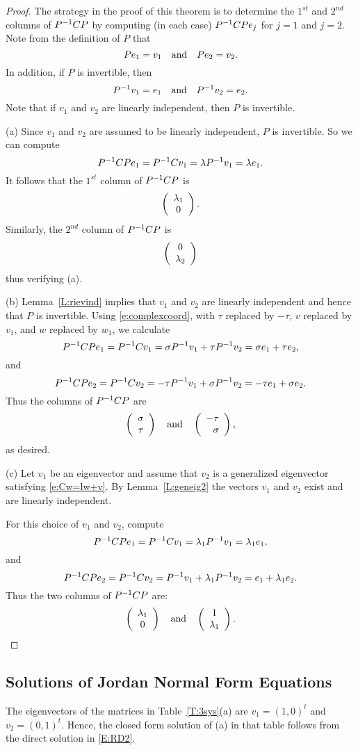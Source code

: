 \documentclass{ximera}
\begin{document}
\begin{proof}
The strategy in the proof of this theorem is to determine the
$1^{st}$ and $2^{nd}$ columns of $P^{-1} CP$ by computing (in each case)
$P^{-1} CPe_j$ for $j=1$ and $j=2$.  Note from the definition of $P$
that
\[
Pe_1 = v_1 \quad\mbox{and}\quad Pe_2 = v_2.
\]
In addition, if $P$ is invertible, then
\[
P^{-1} v_1 = e_1 \quad\mbox{and}\quad P^{-1} v_2 = e_2.
\]
Note that if $v_1$ and $v_2$ are linearly independent, then $P$ is invertible.

(a) \quad Since $v_1$ and $v_2$ are assumed to be linearly independent,
$P$ is invertible.  So we can compute
\[
P^{-1} CPe_1 = P^{-1} C v_1 = \lambda P^{-1} v_1 = \lambda e_1.
\]
It follows that the $1^{st}$ column of $P^{-1} CP$	is
\[
\left(\begin{array}{c} \lambda_1 \\ 0\end{array}\right).
\]
Similarly, the $2^{nd}$ column of $P^{-1} CP$ is
\[
\left(\begin{array}{c} 0 \\ \lambda_2\end{array}\right)
\]
thus verifying (a).

(b) \quad  Lemma~\ref{L:rievind} implies that $v_1$ and $v_2$ are linearly
independent and hence that $P$ is invertible.  Using \eqref{e:complexcoord},
with $\tau$ replaced by $-\tau$, $v$ replaced by $v_1$, and $w$ replaced by
$w_1$, we calculate
\[
P^{-1} CPe_1 = P^{-1} Cv_1 = \sigma P^{-1} v_1 + \tau P^{-1} v_2
= \sigma e_1 + \tau e_2,
\]
and
\[
P^{-1} CPe_2 = P^{-1} Cv_2 = -\tau P^{-1} v_1 + \sigma P^{-1} v_2
= -\tau e_1 + \sigma e_2.
\]
Thus the columns of $P^{-1} CP$ are
\[
\left(\begin{array}{r} \sigma \\ \tau\end{array}\right) \quad\mbox{and}\quad \left(\begin{array}{r} -\tau \\ \sigma\end{array}\right),
\]
as desired.


(c) \quad   Let $v_1$ be an eigenvector and assume that $v_2$ is a
generalized eigenvector satisfying \eqref{e:Cw=lw+v}.  By
Lemma~\ref{L:geneig2} the vectors $v_1$ and $v_2$ exist and are linearly
independent.

For this choice of $v_1$ and $v_2$, compute
\[
P^{-1} CPe_1 = P^{-1} Cv_1 = \lambda_1 P^{-1} v_1 = \lambda_1 e_1,
\]
and
\[
P^{-1} CPe_2 = P^{-1} Cv_2 = P^{-1} v_1+\lambda_1 P^{-1} v_2 = e_1+\lambda_1 e_2.
\]
Thus the two columns of $P^{-1} CP$ are:
\[
\left(\begin{array}{c} \lambda_1 \\ 0\end{array}\right) \quad\mbox{and}\quad \left(\begin{array}{c} 1 \\ \lambda_1\end{array}\right).
\]
  \end{proof}

\subsection*{Solutions of Jordan Normal Form Equations}

The eigenvectors of the matrices in Table~\ref{T:3sys}(a) are 
$v_1=(1,0)^t$ and $v_2=(0,1)^t$.  Hence, the closed form solution 
of (a) in that table follows from the direct solution in \eqref{E:RD2}.
\end{document}
